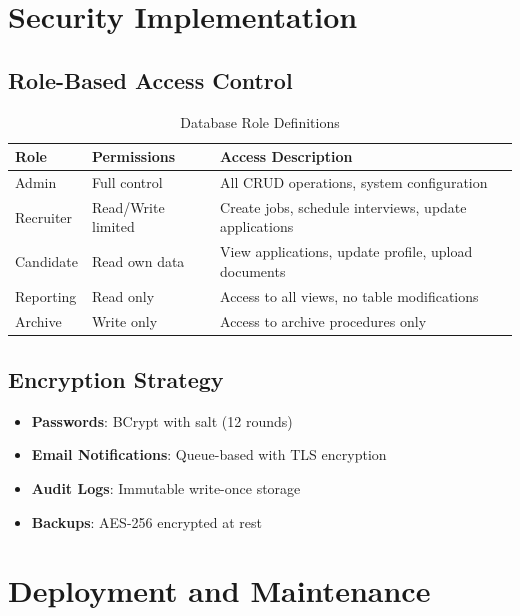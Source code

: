 \documentclass[11pt,a4paper]{article}
\begin{document}
\section{Security Implementation}

\subsection{Role-Based Access Control}
\begin{table}[H]
    \centering
    \begin{tabular}{|l|p{3cm}|p{8cm}|}
        \hline
        \rowcolor{tableheader}
        \textbf{Role} & \textbf{Permissions} & \textbf{Access Description} \\
        \hline
        Admin & Full control & All CRUD operations, system configuration \\
        \hline
        Recruiter & Read/Write limited & Create jobs, schedule interviews, update applications \\
        \hline
        Candidate & Read own data & View applications, update profile, upload documents \\
        \hline
        Reporting & Read only & Access to all views, no table modifications \\
        \hline
        Archive & Write only & Access to archive procedures only \\
        \hline
    \end{tabular}
    \caption{Database Role Definitions}
\end{table}

\subsection{Encryption Strategy}
\begin{itemize}
    \item \textbf{Passwords}: BCrypt with salt (12 rounds)
    \item \textbf{Email Notifications}: Queue-based with TLS encryption
    \item \textbf{Audit Logs}: Immutable write-once storage
    \item \textbf{Backups}: AES-256 encrypted at rest
\end{itemize}

\section{Deployment and Maintenance}
\end{document}
